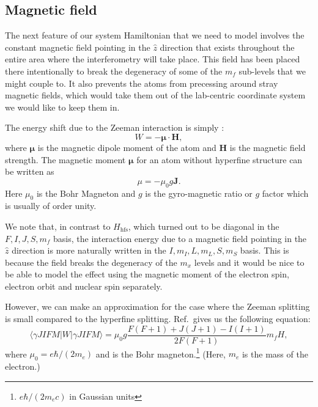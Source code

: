 \subsection{Magnetic field}\label{zeeman}

The next feature of our system Hamiltonian that we need to model involves the constant magnetic field pointing in the $\hat{z}$ direction that exists throughout the entire area where the interferometry will take place. This field has been placed there intentionally to break the degeneracy of some of the $m_f$ sub-levels that we might couple to. It also prevents the atoms from precessing around stray magnetic fields, which would take them out of the lab-centric coordinate system we would like to keep them in.

The energy shift due to the Zeeman interaction is simply \cite{sobelman_spectra}: 
\begin{equation}
W=-\mathbf{\mu}\cdot\mathbf{H},
\end{equation}
where $\mathbf{\mu}$ is the magnetic dipole moment of the atom and $\mathbf{H}$ is the magnetic field strength. The magnetic moment $\mathbf{\mu}$ for an atom without hyperfine structure can be written as \cite{sobelman_spectra}
\begin{equation}
\mu=-\mu_0 g \mathbf{J}.
\end{equation}
Here $\mu_0$ is the Bohr Magneton and $g$ is the gyro-magnetic ratio or $g$ factor which is usually of order unity. 

We note that, in contrast to $H_{\mathrm{hfs}}$, which turned out to be diagonal in the $F, I, J, S, m_f$ basis, the interaction energy due to a magnetic field pointing in the $\hat{z}$ direction is more naturally written in the $I, m_I, L, m_L, S, m_S$ basis. This is because the field breaks the degeneracy of the $m_x$ levels and it would be nice to be able to model the effect using the magnetic moment of the electron spin, electron orbit and nuclear spin separately. 

However, we can make an approximation for the case where the Zeeman splitting is small compared to the hyperfine splitting. 
Ref.\,\cite{sobelman_spectra} gives us the following equation:
\begin{equation} \label{zeemanSobelman}
\langle{\gamma JIFM|W|\gamma JIFM\rangle = \mu_0 g \frac{F(F+1)+J(J+1)-I(I+1)}{2F(F+1)}m_f H},
\end{equation}
where $\mu_0=e\hbar/(2 m_e)$ and is the Bohr magneton.\footnote{$e \hbar / (2 m_e c)$ in Gaussian units} (Here, $m_e$ is the mass of the electron.)

